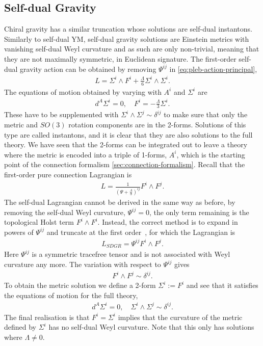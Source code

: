 \documentclass[10pt]{report}
\theoremstyle{definition}
\begin{document}
\subsection{Self-dual Gravity}
Chiral gravity has a similar truncation whose solutions are self-dual instantons. Similarly to self-dual YM, self-dual gravity solutions are Einstein metrics with vanishing self-dual Weyl curvature and as such are only non-trivial, meaning that they are not maximally symmetric, in Euclidean signature. The first-order self-dual gravity action can be obtained by removing $\Psi^{ij}$ in \cref{eq:pleb-action-principal},
\begin{align}
    L = \Sigma^i \wedge F^i + \frac{\Lambda}{6} \Sigma^i \wedge \Sigma^i.
\end{align}
The equations of motion obtained by varying with $A^i$ and $\Sigma^i$ are
\begin{align}
    d^A \Sigma^i = 0, \quad F^i = -\frac{\Lambda}{3} \Sigma^i.
\end{align}
These have to be supplemented with $\Sigma^i \wedge \Sigma^j \sim \delta^{ij}$ to make sure that only the metric and $SO(3)$ rotation components are in the 2-forms. Solutions of this type are called instantons, and it is clear that they are also solutions to the full theory. We have seen that the 2-forms can be integrated out to leave a theory where the metric is encoded into a triple of 1-forms, $A^i$, which is the starting point of the connection formalism \cref{sec:connection-formalism}. Recall that the first-order pure connection Lagrangian is
\begin{align}
    L = \frac{1}{{(\Psi + \frac{\Lambda}{3})}^{ij}} F^i \wedge F^j.
\end{align}
The self-dual Lagrangian cannot be derived in the same way as before, by removing the self-dual Weyl curvature, $\Psi^{ij} = 0$, the only term remaining is the topological Holst term $F^i \wedge F^i$. Instead, the correct method is to expand in powers of $\Psi^{ij}$ and truncate at the first order~\cite{Self_Dual_Gravi_Krasno_2016,Pure_Connection_Krasno_2011}, for which the Lagrangian is 
\begin{align}
    L_{SDGR} = \Psi^{ij} F^i \wedge F^j. \label{eq:self-dual-connect-action}
\end{align}
Here $\Psi^{ij}$ is a symmetric tracefree tensor and is not associated with Weyl curvature any more. The variation with respect to $\Psi^{ij}$ gives
\begin{align}
    F^i \wedge F^j \sim \delta^{ij}.
\end{align}
To obtain the metric solution we define a 2-form $\Sigma^i := F^i$ and see that it satisfies the equations of motion for the full theory,
\begin{align}
    d^A \Sigma^i = 0, \quad \Sigma^i \wedge \Sigma^j \sim \delta^{ij}.
\end{align}
The final realisation is that $F^i = \Sigma^i$ implies that the curvature of the metric defined by $\Sigma^i$ has no self-dual Weyl curvature. Note that this only has solutions where $\Lambda \neq 0$. 
\end{document}
